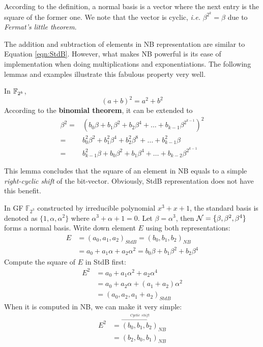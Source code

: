 According to the definition, a normal basis is a vector where the next entry is the square of the former one.
We note that the vector is cyclic, {\it i.e.} $\beta^{2^k} = \beta$ due to {\it Fermat's little theorem}.

The addition and subtraction of elements in NB representation are similar to Equation \ref{eqn:StdB}.
However, what makes NB powerful is its ease of implementation when doing multiplications and exponentiations.
The following lemmas and examples illustrate this fabulous property very well.
\begin{Lemma}[Square of NB]
\label{lem:squareNB}
In ${\mathbb{F}}_{2^k}$, 
\begin{equation*}
(a+b)^2 = a^2 + b^2
\end{equation*}
According to the \textbf{binomial theorem}, it can be extended to
\begin{align*}
\beta^2 =&(b_0\beta + b_1\beta^2 + b_2\beta^4 + \dots + b_{k-1}\beta^{2^{k-1}})^2 \\
=& b_0^2\beta^2 + b_1^2\beta^4 + b_2^2\beta^8 + \dots + b_{k-1}^2\beta \\
=& b_{k-1}^2\beta + b_0\beta^2 + b_1\beta^4 + \dots + b_{k-2}\beta^{2^{k-1}}
\end{align*}
\end{Lemma}
This lemma concludes that the square of an element in NB equals to a simple {\it right-cyclic shift} of the bit-vector.
Obviously, StdB representation does not have this benefit.

\begin{Example}[Square of NB]
In GF $\mathbb F_{2^3}$ constructed by irreducible polynomial $x^3 + x + 1$, the standard basis is denoted as 
$\{ 1, \alpha, \alpha^2\}$ where $\alpha^3+\alpha+1=0$.
Let $\beta = \alpha^3$, then ${\mathcal{N}} = \{ \beta, \beta^2, \beta^4\}$ forms a normal basis. 
Write down element $E$ using both representations:
\begin{align*}
E &= (a_0,a_1,a_2)_{StdB} = (b_0,b_1,b_2)_{NB} \\
  &= a_0 + a_1\alpha + a_2\alpha^2 = b_0\beta + b_1\beta^2 + b_2\beta^4
\end{align*}
Compute the square of $E$ in StdB first:
\begin{align*}
E^2 &= a_0 + a_1\alpha^2 + a_2\alpha^4 \\
    &= a_0 + a_2\alpha + (a_1 + a_2)\alpha^2 \\
    &= (a_0,a_2,a_1+a_2)_{StdB}
\end{align*}
When it is computed in NB, we can make it very simple:
\begin{align*}
E^2 &= \overset{\xrightarrow{Cyclic~~shift}}{(b_0,b_1,b_2)}_{NB} \\
	&= (b_2,b_0,b_1)_{NB}
\end{align*}
\end{Example}

